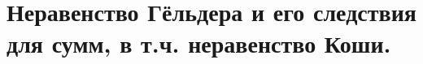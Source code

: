 \documentclass[../main.tex]{subfiles}
\begin{document}
\newpage
\section{Неравенство Гёльдера и его следствия для сумм, в т.ч. неравенство Коши.}
\end{document}
